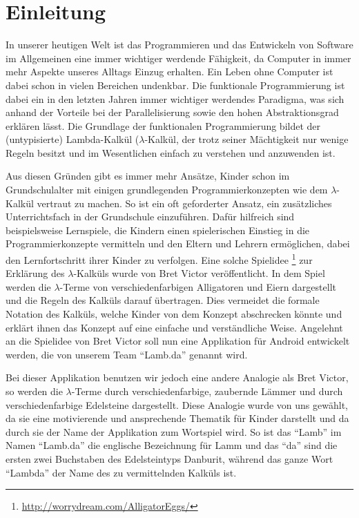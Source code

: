 \section{Einleitung}

In unserer heutigen Welt ist das Programmieren und das Entwickeln von Software im Allgemeinen eine immer wichtiger werdende Fähigkeit, da Computer in immer mehr Aspekte unseres Alltags Einzug erhalten. Ein Leben ohne Computer ist dabei schon in vielen Bereichen undenkbar. \newline 
Die funktionale Programmierung ist dabei ein in den letzten Jahren immer wichtiger werdendes Paradigma, was sich anhand der Vorteile bei der Parallelisierung sowie den hohen  Abstraktionsgrad erklären lässt. Die Grundlage der funktionalen Programmierung bildet der (untypisierte) Lambda-Kalkül ($\lambda$-Kalkül, der trotz seiner Mächtigkeit nur wenige Regeln besitzt und im Wesentlichen einfach zu verstehen und anzuwenden ist.

Aus diesen Gründen gibt es immer mehr Ansätze, Kinder schon im Grundschulalter mit einigen grundlegenden Programmierkonzepten wie dem $\lambda$-Kalkül vertraut zu machen.  So ist ein oft geforderter Ansatz, ein zusätzliches Unterrichtsfach in der Grundschule einzuführen. Dafür hilfreich sind beispielsweise Lernspiele, die Kindern einen spielerischen Einstieg in die Programmierkonzepte vermitteln und den Eltern und Lehrern ermöglichen, dabei den Lernfortschritt ihrer Kinder zu verfolgen.\newline
Eine solche Spielidee \footnote{\url{http://worrydream.com/AlligatorEggs/}} zur Erklärung des $\lambda$-Kalküls wurde von Bret Victor veröffentlicht. In dem Spiel werden die $\lambda$-Terme von verschiedenfarbigen Alligatoren und Eiern dargestellt und die Regeln des Kalküls darauf übertragen. Dies vermeidet die formale Notation des Kalküls, welche Kinder von dem Konzept abschrecken könnte und erklärt ihnen das Konzept auf eine einfache und verständliche Weise. Angelehnt an die Spielidee von Bret Victor soll nun eine Applikation für Android entwickelt werden, die von unserem Team "`Lamb.da"' genannt wird. 

Bei dieser Applikation benutzen wir jedoch eine andere Analogie als Bret Victor, so werden die $\lambda$-Terme durch verschiedenfarbige, zaubernde Lämmer und durch verschiedenfarbige Edelsteine dargestellt. Diese Analogie wurde von uns gewählt, da sie eine motivierende und ansprechende Thematik für Kinder darstellt und da durch sie der Name der Applikation zum Wortspiel wird. So ist das "`Lamb"' im Namen "`Lamb.da"' die englische Bezeichnung für Lamm und das "`da"' sind die ersten zwei Buchstaben des Edelsteintyps Danburit, während das ganze Wort "`Lambda"' der Name des zu vermittelnden Kalküls ist. 

